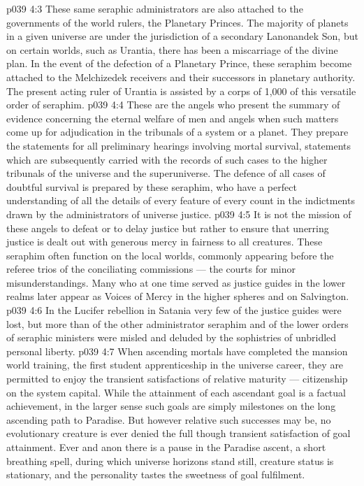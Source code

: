 \vs p039 4:3 These same seraphic administrators are also attached to the governments of the world rulers, the Planetary Princes. The majority of planets in a given universe are under the jurisdiction of a secondary Lanonandek Son, but on certain worlds, such as Urantia, there has been a miscarriage of the divine plan. In the event of the defection of a Planetary Prince, these seraphim become attached to the Melchizedek receivers and their successors in planetary authority. The present acting ruler of Urantia is assisted by a corps of 1,000 of this versatile order of seraphim.
\vs p039 4:4 \bibnobreakspace {} These are the angels who present the summary of evidence concerning the eternal welfare of men and angels when such matters come up for adjudication in the tribunals of a system or a planet. They prepare the statements for all preliminary hearings involving mortal survival, statements which are subsequently carried with the records of such cases to the higher tribunals of the universe and the superuniverse. The defence of all cases of doubtful survival is prepared by these seraphim, who have a perfect understanding of all the details of every feature of every count in the indictments drawn by the administrators of universe justice.
\vs p039 4:5 It is not the mission of these angels to defeat or to delay justice but rather to ensure that unerring justice is dealt out with generous mercy in fairness to all creatures. These seraphim often function on the local worlds, commonly appearing before the referee trios of the conciliating commissions --- the courts for minor misunderstandings. Many who at one time served as justice guides in the lower realms later appear as Voices of Mercy in the higher spheres and on Salvington.
\vs p039 4:6 In the Lucifer rebellion in Satania very few of the justice guides were lost, but more than  of the other administrator seraphim and of the lower orders of seraphic ministers were misled and deluded by the sophistries of unbridled personal liberty.
\vs p039 4:7 \bibnobreakspace {} When ascending mortals have completed the mansion world training, the first student apprenticeship in the universe career, they are permitted to enjoy the transient satisfactions of relative maturity --- citizenship on the system capital. While the attainment of each ascendant goal is a factual achievement, in the larger sense such goals are simply milestones on the long ascending path to Paradise. But however relative such successes may be, no evolutionary creature is ever denied the full though transient satisfaction of goal attainment. Ever and anon there is a pause in the Paradise ascent, a short breathing spell, during which universe horizons stand still, creature status is stationary, and the personality tastes the sweetness of goal fulfilment.
